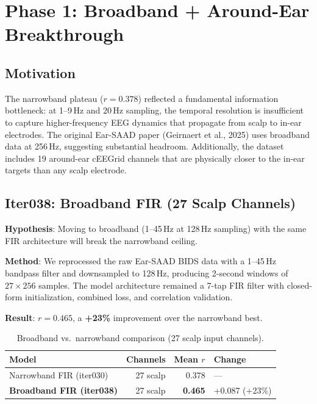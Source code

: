 \documentclass[11pt,a4paper]{article}
\begin{document}
\section{Phase 1: Broadband + Around-Ear Breakthrough}

\subsection{Motivation}

The narrowband plateau ($r=0.378$) reflected a fundamental information
bottleneck: at 1--9\,Hz and 20\,Hz sampling, the temporal resolution is
insufficient to capture higher-frequency EEG dynamics that propagate from
scalp to in-ear electrodes. The original Ear-SAAD paper (Geirnaert et al.,
2025) uses broadband data at 256\,Hz, suggesting substantial headroom.
Additionally, the dataset includes 19 around-ear cEEGrid channels that are
physically closer to the in-ear targets than any scalp electrode.

\subsection{Iter038: Broadband FIR (27 Scalp Channels)}

\textbf{Hypothesis}: Moving to broadband (1--45\,Hz at 128\,Hz sampling)
with the same FIR architecture will break the narrowband ceiling.

\textbf{Method}: We reprocessed the raw Ear-SAAD BIDS data with a 1--45\,Hz
bandpass filter and downsampled to 128\,Hz, producing 2-second windows of
$27 \times 256$ samples. The model architecture remained a 7-tap FIR filter
with closed-form initialization, combined loss, and correlation validation.

\textbf{Result}: $r = 0.465$, a \textbf{+23\%} improvement over the
narrowband best.

\begin{table}[H]
\centering
\caption{Broadband vs.\ narrowband comparison (27 scalp input channels).}
\begin{tabular}{lrrl}
\toprule
Model & Channels & Mean $r$ & Change \\
\midrule
Narrowband FIR (iter030) & 27 scalp & 0.378 & --- \\
\textbf{Broadband FIR (iter038)} & 27 scalp & \textcolor{good}{\textbf{0.465}} & \textcolor{good}{+0.087 (+23\%)} \\
\bottomrule
\end{tabular}
\end{table}
\end{document}
